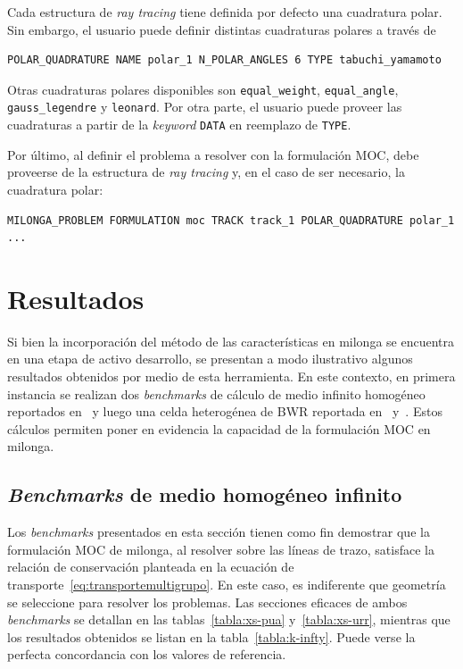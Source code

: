 \documentclass[11pt]{article}
\numberwithin{equation}{section}
\begin{document}
Cada estructura de \emph{ray tracing} tiene definida por defecto una cuadratura polar. Sin embargo, el usuario puede definir distintas cuadraturas polares a trav\'es de

\begin{lstlisting}[style=wasora]
POLAR_QUADRATURE NAME polar_1 N_POLAR_ANGLES 6 TYPE tabuchi_yamamoto
\end{lstlisting}

\noindent
Otras cuadraturas polares disponibles son \texttt{equal_weight}, \texttt{equal_angle}, \texttt{gauss_legendre} y \texttt{leonard}. Por otra parte, el usuario puede proveer las cuadraturas a partir de la \emph{keyword} \texttt{DATA} en reemplazo de \texttt{TYPE}.

Por \'ultimo, al definir el problema a resolver con la formulación MOC, debe proveerse de la estructura de \emph{ray tracing} y, en el caso de ser necesario, la cuadratura polar:

\begin{lstlisting}[style=wasora]
MILONGA_PROBLEM FORMULATION moc TRACK track_1 POLAR_QUADRATURE polar_1 ...
\end{lstlisting}


\section{Resultados}

Si bien la incorporaci\'on del m\'etodo de las características en milonga se encuentra en una etapa de activo desarrollo, se presentan a modo ilustrativo algunos resultados obtenidos por medio de esta herramienta. En este contexto, en primera instancia se realizan dos \emph{benchmarks} de c\'alculo de medio infinito homog\'eneo reportados en~\cite{sood} y luego una celda heterog\'enea de BWR reportada en~\cite{hong} y~\cite{Mazumdar}. Estos c\'alculos permiten poner en evidencia la capacidad de la formulación MOC en milonga.

\subsection{\emph{Benchmarks} de medio homog\'eneo infinito}

Los \emph{benchmarks} presentados en esta sección tienen como fin demostrar que la formulación MOC de milonga, al resolver sobre las l\'ineas de trazo, satisface la relaci\'on de conservaci\'on planteada en la ecuación de transporte~\eqref{eq:transportemultigrupo}. En este caso, es indiferente que geometr\'ia se seleccione para resolver los problemas. Las secciones eficaces de ambos \emph{benchmarks} se detallan en las tablas~\ref{tabla:xs-pua} y~\ref{tabla:xs-urr}, mientras que los resultados obtenidos se listan en la tabla~\ref{tabla:k-infty}. Puede verse la perfecta concordancia con los valores de referencia.
\end{document}
